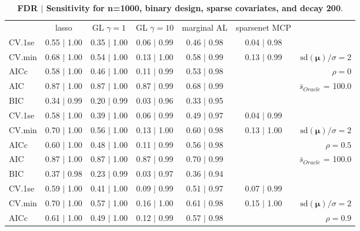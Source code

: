 \clearpage
\begin{table}\vspace{-.5cm}
\caption[l]{ {\it }
{ \bf FDR $\boldsymbol{\mid}$ Sensitivity for n=1000, binary design, sparse covariates, and  decay  200}.}
\vspace{-.5cm}
\footnotesize{}
\begin{center}
\begin{tabular}{l*{5}{c}|r}
 & lasso & GL $\gamma=1$ & GL $\gamma=10$ & marginal AL & sparsenet MCP  & \\
 \cline{1-7}
CV.1se & 0.55 $\mid$ 1.00 & 0.35 $\mid$ 1.00 & 0.06 $\mid$ 0.99 & 0.46 $\mid$ 0.98 & 0.04 $\mid$ 0.98 & \\
CV.min & 0.68 $\mid$ 1.00 & 0.54 $\mid$ 1.00 & 0.13 $\mid$ 1.00 & 0.58 $\mid$ 0.99 & 0.13 $\mid$ 0.99 &  $\mathrm{sd}(\mathbf{\mu})/\sigma=2$ \\
AICc & 0.58 $\mid$ 1.00 & 0.46 $\mid$ 1.00 & 0.11 $\mid$ 0.99 & 0.53 $\mid$ 0.98 & & $\rho=0$ \\
AIC & 0.87 $\mid$ 1.00 & 0.87 $\mid$ 1.00 & 0.87 $\mid$ 0.99 & 0.68 $\mid$ 0.99 & &  \multirow{2}{*}{$\bar{s}_{Oracle}$ = 100.0} \\
BIC & 0.34 $\mid$ 0.99 & 0.20 $\mid$ 0.99 & 0.03 $\mid$ 0.96 & 0.33 $\mid$ 0.95 & &  \\
 \hline 
CV.1se & 0.58 $\mid$ 1.00 & 0.39 $\mid$ 1.00 & 0.06 $\mid$ 0.99 & 0.49 $\mid$ 0.97 & 0.04 $\mid$ 0.99 & \\
CV.min & 0.70 $\mid$ 1.00 & 0.56 $\mid$ 1.00 & 0.13 $\mid$ 1.00 & 0.60 $\mid$ 0.98 & 0.13 $\mid$ 1.00 &  $\mathrm{sd}(\mathbf{\mu})/\sigma=2$ \\
AICc & 0.60 $\mid$ 1.00 & 0.48 $\mid$ 1.00 & 0.11 $\mid$ 0.99 & 0.56 $\mid$ 0.98 & & $\rho=0.5$ \\
AIC & 0.87 $\mid$ 1.00 & 0.87 $\mid$ 1.00 & 0.87 $\mid$ 0.99 & 0.70 $\mid$ 0.99 & &  \multirow{2}{*}{$\bar{s}_{Oracle}$ = 100.0} \\
BIC & 0.37 $\mid$ 0.98 & 0.23 $\mid$ 0.99 & 0.03 $\mid$ 0.97 & 0.36 $\mid$ 0.94 & &  \\
 \hline 
CV.1se & 0.59 $\mid$ 1.00 & 0.41 $\mid$ 1.00 & 0.09 $\mid$ 0.99 & 0.51 $\mid$ 0.97 & 0.07 $\mid$ 0.99 & \\
CV.min & 0.70 $\mid$ 1.00 & 0.57 $\mid$ 1.00 & 0.16 $\mid$ 1.00 & 0.61 $\mid$ 0.98 & 0.15 $\mid$ 1.00 &  $\mathrm{sd}(\mathbf{\mu})/\sigma=2$ \\
AICc & 0.61 $\mid$ 1.00 & 0.49 $\mid$ 1.00 & 0.12 $\mid$ 0.99 & 0.57 $\mid$ 0.98 & & $\rho=0.9$ \\

\end{tabular}
\end{center}
\end{table}
